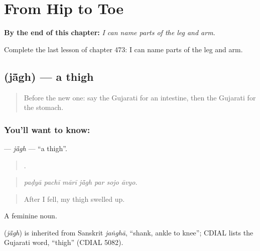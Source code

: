 
\chapter{From Hip to Toe}
\label{ch:gu-from-hip-to-toe}

\begin{chapteropening}
\textbf{By the end of this chapter:} \emph{I can name parts of the leg and arm.}

Complete the last lesson of chapter 473: I can name parts of the leg and arm.
\end{chapteropening}

\section[\texorpdfstring{\gu{જાંઘ} (jā̃gh)}{જાંઘ (jā̃gh)}]{ (jā̃gh) — a thigh}

\label{lesson:GU-C473-jagh}



\begin{quote}
Before the new one: say the Gujarati for an intestine, then the Gujarati for the stomach.
\end{quote}

\subsection*{You'll want to know: }
\textbf{} — \emph{jā̃gh} — \textquotedblleft{}a thigh\textquotedblright{}.

\begin{quote}
      .
\end{quote}

\begin{quote}
\emph{paḍyā pachī mārī jā̃gh par sojo āvyo.}
\end{quote}

\begin{quote}
After I fell, my thigh swelled up.
\end{quote}

A feminine noun.

\begin{cousinweb}
\textbf{} (\emph{jā̃gh}) is inherited from Sanskrit \emph{jaṅghā}, \textquotedblleft{}shank, ankle to knee\textquotedblright{}; CDIAL lists the Gujarati word, \textquotedblleft{}thigh\textquotedblright{} (CDIAL 5082).
\end{cousinweb}

